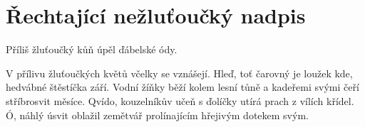\section{Řechtající nežluťoučký nadpis}

Příliš žluťoučký kůň úpěl ďábelské ódy.

V přílivu žluťoučkých květů včelky se vznášejí.
Hleď, toť čarovný je loužek kde, hedvábné štěstíčka září.
Vodní žíňky běží kolem lesní tůně a kadeřemi svými čeří stříbrosvit měsíce.
Qvído, kouzelníkův učeň s ďolíčky utírá prach z vílích křídel.
Ó, náhlý úsvit oblažil zemětvář prolínajícím hřejivým dotekem svým.
